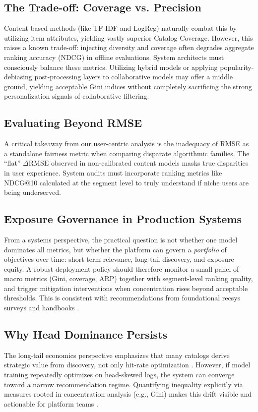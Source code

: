 \documentclass[conference]{IEEEtran}
\begin{document}
\subsection{The Trade-off: Coverage vs. Precision}
Content-based methods (like TF-IDF and LogReg) naturally combat this by utilizing item attributes, yielding vastly superior Catalog Coverage. However, this raises a known trade-off: injecting diversity and coverage often degrades aggregate ranking accuracy (NDCG) in offline evaluations. System architects must consciously balance these metrics. Utilizing hybrid models or applying popularity-debiasing post-processing layers to collaborative models may offer a middle ground, yielding acceptable Gini indices without completely sacrificing the strong personalization signals of collaborative filtering.

\subsection{Evaluating Beyond RMSE}
A critical takeaway from our user-centric analysis is the inadequacy of RMSE as a standalone fairness metric when comparing disparate algorithmic families. The ``flat'' $\Delta\mathrm{RMSE}$ observed in non-calibrated content models masks true disparities in user experience. System audits must incorporate ranking metrics like NDCG@10 calculated at the segment level to truly understand if niche users are being underserved.

\subsection{Exposure Governance in Production Systems}
From a systems perspective, the practical question is not whether one model dominates all metrics, but whether the platform can govern a \emph{portfolio} of objectives over time: short-term relevance, long-tail discovery, and exposure equity. A robust deployment policy should therefore monitor a small panel of macro metrics (Gini, coverage, ARP) together with segment-level ranking quality, and trigger mitigation interventions when concentration rises beyond acceptable thresholds. This is consistent with recommendations from foundational recsys surveys and handbooks \cite{adomavicius2005toward,ricci2015recommender}.

\subsection{Why Head Dominance Persists}
The long-tail economics perspective emphasizes that many catalogs derive strategic value from discovery, not only hit-rate optimization \cite{anderson2004long}. However, if model training repeatedly optimizes on head-skewed logs, the system can converge toward a narrow recommendation regime. Quantifying inequality explicitly via measures rooted in concentration analysis (e.g., Gini) makes this drift visible and actionable for platform teams \cite{cowell2011measuring}.
\end{document}
